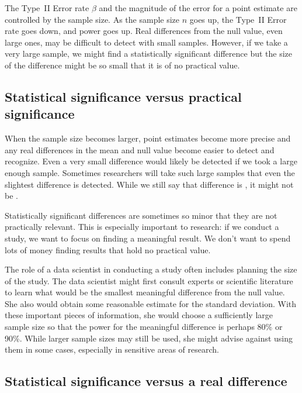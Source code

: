The Type~II Error rate $\beta$ and the magnitude of the error for a point estimate are controlled by the sample size. As the sample size $n$ goes up, the Type~II Error rate goes down, and power goes up. Real differences from the null value, even large ones, may be difficult to detect with small samples. However, if we take a very large sample, we might find a statistically significant difference but the size of the difference might be so small that it is of no practical value.



\D{\newpage}

\subsection{Statistical significance versus practical significance}

When the sample size becomes larger, point estimates become more precise and any real differences in the mean and null value become easier to detect and recognize. Even a very small difference would likely be detected if we took a large enough sample. Sometimes researchers will take such large samples that even the slightest difference is detected. While we still say that difference is , it might not be .

Statistically significant differences are sometimes so minor that they are not practically relevant. This is especially important to research: if we conduct a study, we want to focus on finding a meaningful result. We don't want to spend lots of money finding results that hold no practical value.

The role of a data scientist in conducting a study often includes planning the size of the study. The data scientist might first consult experts or scientific literature to learn what would be the smallest meaningful difference from the null value. She also would obtain some reasonable estimate for the standard deviation. With these important pieces of information, she would choose a sufficiently large sample size so that the power for the meaningful difference is perhaps 80\% or 90\%. While larger sample sizes may still be used, she might advise against using them in some cases, especially in sensitive areas of research.

\subsection{Statistical significance versus a real difference}

